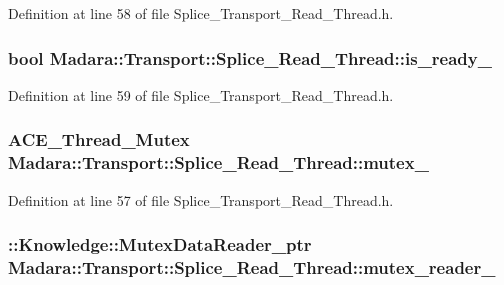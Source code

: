 Definition at line 58 of file Splice\_\-Transport\_\-Read\_\-Thread.h.

\hypertarget{classMadara_1_1Transport_1_1Splice__Read__Thread_a696974cc3cc3ff803f65a3e0b00038dc}{
\subsubsection[{is\_\-ready\_\-}]{\setlength{\rightskip}{0pt plus 5cm}bool {\bf Madara::Transport::Splice\_\-Read\_\-Thread::is\_\-ready\_\-}}}
\label{de/db7/classMadara_1_1Transport_1_1Splice__Read__Thread_a696974cc3cc3ff803f65a3e0b00038dc}


Definition at line 59 of file Splice\_\-Transport\_\-Read\_\-Thread.h.

\hypertarget{classMadara_1_1Transport_1_1Splice__Read__Thread_a9c431adb377e9c87e7461e3f74dd57bb}{
\subsubsection[{mutex\_\-}]{\setlength{\rightskip}{0pt plus 5cm}ACE\_\-Thread\_\-Mutex {\bf Madara::Transport::Splice\_\-Read\_\-Thread::mutex\_\-}}}
\label{de/db7/classMadara_1_1Transport_1_1Splice__Read__Thread_a9c431adb377e9c87e7461e3f74dd57bb}


Definition at line 57 of file Splice\_\-Transport\_\-Read\_\-Thread.h.

\hypertarget{classMadara_1_1Transport_1_1Splice__Read__Thread_a6ce0b58da3928412036a1b3e070a55b8}{
\subsubsection[{mutex\_\-reader\_\-}]{\setlength{\rightskip}{0pt plus 5cm}::{\bf Knowledge::MutexDataReader\_\-ptr} {\bf Madara::Transport::Splice\_\-Read\_\-Thread::mutex\_\-reader\_\-}}}
\label{de/db7/classMadara_1_1Transport_1_1Splice__Read__Thread_a6ce0b58da3928412036a1b3e070a55b8}


